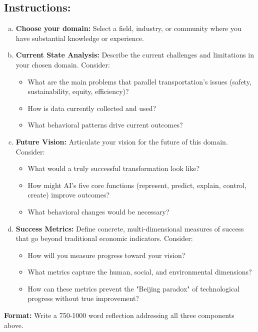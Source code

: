 \documentclass[11pt]{article}
\begin{document}
\subsection{Instructions:}
\begin{enumerate}[(a)]
\item \textbf{Choose your domain:} Select a field, industry, or community where you have substantial knowledge or experience.

\item \textbf{Current State Analysis:} Describe the current challenges and limitations in your chosen domain. Consider:
\begin{itemize}
\item What are the main problems that parallel transportation's issues (safety, sustainability, equity, efficiency)?
\item How is data currently collected and used?
\item What behavioral patterns drive current outcomes?
\end{itemize}

\item \textbf{Future Vision:} Articulate your vision for the future of this domain. Consider:
\begin{itemize}
\item What would a truly successful transformation look like?
\item How might AI's five core functions (represent, predict, explain, control, create) improve outcomes?
\item What behavioral changes would be necessary?
\end{itemize}

\item \textbf{Success Metrics:} Define concrete, multi-dimensional measures of success that go beyond traditional economic indicators. Consider:
\begin{itemize}
\item How will you measure progress toward your vision?
\item What metrics capture the human, social, and environmental dimensions?
\item How can these metrics prevent the "Beijing paradox" of technological progress without true improvement?
\end{itemize}
\end{enumerate}

\textbf{Format:} Write a 750-1000 word reflection addressing all three components above.
\end{document}
